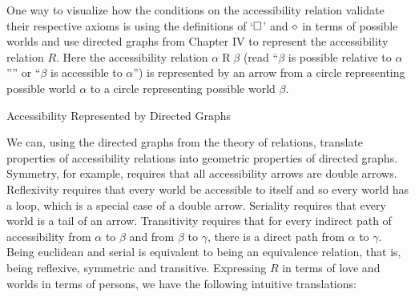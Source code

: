 \documentclass[
  12pt,
  letterpaper,
  DIV=11,
  numbers=noendperiod,
  twoside]{scrreprt}
\theoremstyle{remark}
\begin{document}
One way to visualize how the conditions on the accessibility relation
validate their respective axioms is using the definitions of
`\(\small\square\)' and \(\LARGE\diamond\) in terms of possible worlds
and use directed graphs from Chapter IV to represent the accessibility
relation \(\mathbin{R}\). Here the accessibility relation
\(\alpha\mathbin{R}\beta\) (read ``\(\beta\) is possible relative to
\(\alpha\)'''' or ``\(\beta\) is accessible to \(\alpha\)'') is
represented by an arrow from a circle representing possible world
\(\alpha\) to a circle representing possible world \(\beta\).

\begin{marginfigure}


\caption{\label{fig-accessibility-represented-by-directed-graphs}Accessibility
Represented by Directed Graphs}

\end{marginfigure}%

We can, using the directed graphs from the theory of relations,
translate properties of accessibility relations into geometric
properties of directed graphs. Symmetry, for example, requires that all
accessibility arrows are double arrows. Reflexivity requires that every
world be accessible to itself and so every world has a loop, which is a
special case of a double arrow. Seriality requires that every world is a
tail of an arrow. Transitivity requires that for every indirect path of
accessibility from \(\alpha\) to \(\beta\) and from \(\beta\) to
\(\gamma\), there is a direct path from \(\alpha\) to \(\gamma\). Being
euclidean and serial is equivalent to being an equivalence relation,
that is, being reflexive, symmetric and transitive. Expressing
\(\mathbin{R}\) in terms of love and worlds in terms of persons, we have
the following intuitive translations:
\end{document}
